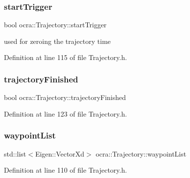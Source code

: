 \subsubsection{\texorpdfstring{start\+Trigger}{startTrigger}}
{\footnotesize\ttfamily bool ocra\+::\+Trajectory\+::start\+Trigger\hspace{0.3cm}{\ttfamily [protected]}}

used for zeroing the trajectory time 

Definition at line 115 of file Trajectory.\+h.

\hypertarget{classocra_1_1Trajectory_ae3367f25d52a9b411a86f75a7b7d06ca}{}\label{classocra_1_1Trajectory_ae3367f25d52a9b411a86f75a7b7d06ca} 
\subsubsection{\texorpdfstring{trajectory\+Finished}{trajectoryFinished}}
{\footnotesize\ttfamily bool ocra\+::\+Trajectory\+::trajectory\+Finished\hspace{0.3cm}{\ttfamily [protected]}}



Definition at line 123 of file Trajectory.\+h.

\hypertarget{classocra_1_1Trajectory_a37630b26ba23826298167f37534ff6f3}{}\label{classocra_1_1Trajectory_a37630b26ba23826298167f37534ff6f3} 
\subsubsection{\texorpdfstring{waypoint\+List}{waypointList}}
{\footnotesize\ttfamily std\+::list$<$Eigen\+::\+Vector\+Xd$>$ ocra\+::\+Trajectory\+::waypoint\+List\hspace{0.3cm}{\ttfamily [protected]}}



Definition at line 110 of file Trajectory.\+h.

\hypertarget{classocra_1_1Trajectory_ab0514f8c3c8d4827b19dc863ff800b43}{}\label{classocra_1_1Trajectory_ab0514f8c3c8d4827b19dc863ff800b43} 
